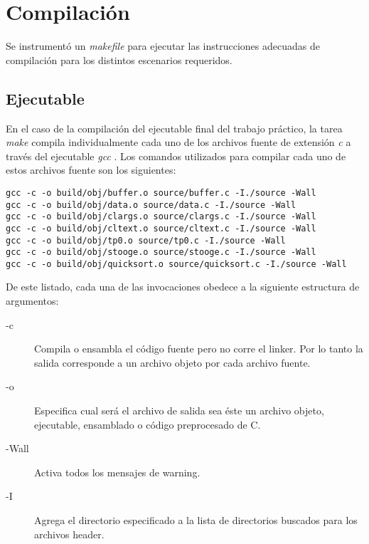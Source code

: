 \documentclass[a4paper,11pt]{article}
\begin{document}
\section{Compilación}

Se instrumentó un \textit{makefile} \cite{WIKIMAKE} para ejecutar las
instrucciones adecuadas de compilación para los distintos escenarios
requeridos.

\subsection{Ejecutable}

En el caso de la compilación del ejecutable final del trabajo práctico, la
tarea \textit{make} compila individualmente cada uno de los archivos fuente de
extensión \textit{c} a través del ejecutable \textit{gcc} \cite{WIKIGCC}. Los
comandos utilizados para compilar cada uno de estos archivos fuente son los
siguientes:

\begin{lstlisting}
gcc -c -o build/obj/buffer.o source/buffer.c -I./source -Wall
gcc -c -o build/obj/data.o source/data.c -I./source -Wall
gcc -c -o build/obj/clargs.o source/clargs.c -I./source -Wall
gcc -c -o build/obj/cltext.o source/cltext.c -I./source -Wall
gcc -c -o build/obj/tp0.o source/tp0.c -I./source -Wall
gcc -c -o build/obj/stooge.o source/stooge.c -I./source -Wall
gcc -c -o build/obj/quicksort.o source/quicksort.c -I./source -Wall
\end{lstlisting}

De este listado, cada una de las invocaciones obedece a la siguiente estructura
de argumentos:

\begin{description}

  \item[-c] Compila o ensambla el código fuente pero no corre el linker.  Por
    lo tanto la salida corresponde a un archivo objeto por cada archivo fuente.

  \item[-o] Especifica cual será el archivo de salida sea éste un archivo
    objeto, ejecutable, ensamblado o código preprocesado de C.

  \item[-Wall] Activa todos los mensajes de warning.

  \item[-I] Agrega el directorio especificado a la lista de directorios
    buscados para los archivos header.

\end{description}
\end{document}
